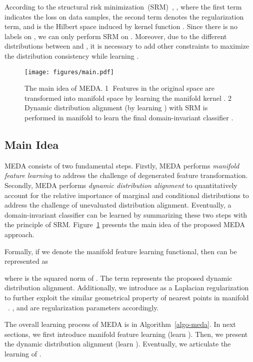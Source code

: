 \documentclass[sigconf]{acmart}
\begin{document}
According to the structural risk minimization~(SRM)~\cite{vapnik1998statistical}, , where the first term indicates the loss on data samples, the second term denotes the regularization term, and  is the Hilbert space induced by kernel function . Since there is no labels on , we can only perform SRM on . Moreover, due to the different distributions between  and , it is necessary to add other constraints to maximize the distribution consistency while learning .

\begin{figure}[t]
	\centering
	\texttt{[image: figures/main.pdf]}
	\caption{The main idea of MEDA. \textcircled{1} Features in the original space are transformed into manifold space by learning the manifold kernel . \textcircled{2} Dynamic distribution alignment (by learning ) with SRM is performed in manifold to learn the final domain-invariant classifier .}
	\label{fig-main}
\end{figure}

\subsection{Main Idea}


MEDA consists of two fundamental steps. Firstly, MEDA performs \textit{manifold feature learning} to address the challenge of degenerated feature transformation. Secondly, MEDA performs \textit{dynamic distribution alignment} to quantitatively account for the relative importance of marginal and conditional distributions to address the challenge of unevaluated distribution alignment. Eventually, a domain-invariant classifier  can be learned by summarizing these two steps with the principle of SRM. Figure~\ref{fig-main} presents the main idea of the proposed MEDA approach. 

Formally, if we denote  the manifold feature learning functional, then  can be represented as


where  is the squared norm of . The term  represents the proposed dynamic distribution alignment. Additionally, we introduce  as a Laplacian regularization to further exploit the similar geometrical property of nearest points in manifold ~\cite{belkin2006manifold}. , and  are regularization parameters accordingly.

The overall learning process of MEDA is in Algorithm~\ref{algo-meda}. In next sections, we first introduce manifold feature learning (learn ). Then, we present the dynamic distribution alignment (learn ). Eventually, we articulate the learning of .
\end{document}

